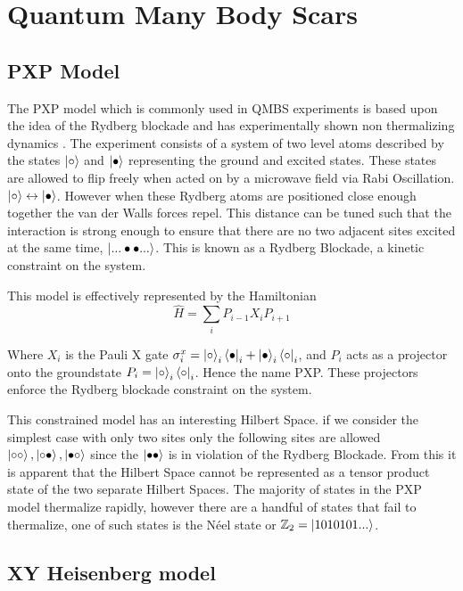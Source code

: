 \section{Quantum Many Body Scars}

\subsection{PXP Model}
The PXP model which is commonly used in QMBS experiments is based upon the idea of the Rydberg blockade and has experimentally shown non thermalizing dynamics \cite{bernien_probing_2017}.  The experiment consists of a system of two level atoms described by the states $\ket{\circ}$ and $\ket{\bullet}$ representing the ground and excited states. These states are allowed to flip freely when acted on by a microwave field via Rabi Oscillation. $\ket{\circ} \leftrightarrow \ket{\bullet}$. However when these Rydberg atoms are positioned close enough together the van der Walls forces repel. This distance can be tuned such that the interaction is strong enough to ensure that there are no two adjacent sites excited at the same time, $\ket{...\bullet \bullet ...}$. This is known as a Rydberg Blockade, a kinetic constraint on the system.

This model is effectively represented by the Hamiltonian 
\begin{equation}
\hat{H} = \sum_i P_{i-1}X_iP_{i+1}
\end{equation}

Where $X_i$ is the Pauli X gate $\sigma^x_i = \ket{\circ}_i\bra{\bullet}_i+\ket{\bullet}_i\bra{\circ}_i$, and $P_i$ acts as a projector onto the groundstate $P_i = \ket{\circ}_i\bra{\circ}_i$. Hence the name PXP. These projectors enforce the Rydberg blockade constraint on the system.  

This constrained model has an interesting Hilbert Space. if we consider the simplest case with only two sites only the following sites are allowed $\ket{\circ \circ},\ket{\circ \bullet},\ket{\bullet \circ}$ since the $\ket{\bullet \bullet}$ is in violation of the Rydberg Blockade. From this it is apparent that the Hilbert Space cannot be represented as a tensor product state of the two separate Hilbert Spaces.
The majority of states in the PXP model thermalize rapidly, however there are a handful of states that fail to thermalize, one of such states is the N\'eel state or $\mathbb{Z}_2 = \ket{1010101...}$. \cite{turner_quantum_2018-1, chen_dynamics_2022}

\subsection{XY Heisenberg model} \label{sec:xymodel}

